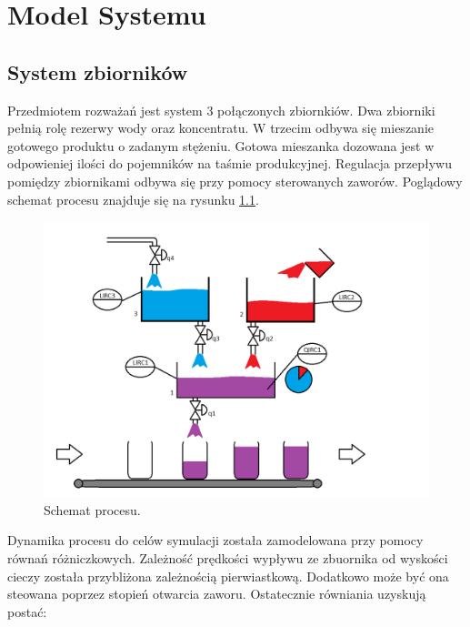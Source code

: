 \chapter{Model Systemu}
\label{model_systemu}
\section{System zbiorników}
\indent Przedmiotem rozważań jest system 3 połączonych zbiornkiów. Dwa zbiorniki pełnią rolę rezerwy wody oraz koncentratu. W trzecim odbywa się mieszanie gotowego produktu o zadanym stężeniu. Gotowa mieszanka dozowana jest w odpowieniej ilości do pojemników na taśmie produkcyjnej. Regulacja przepływu pomiędzy zbiornikami odbywa się przy pomocy sterowanych zaworów. Poglądowy schemat procesu znajduje się na rysunku \ref{fig:Proces}.
\begin{figure}[H]
	\centering
	\includegraphics[scale = 0.5]{fig/Proces_schema_updated.png}
	\caption{Schemat procesu.}
	\label{fig:Proces}
\end{figure}

Dynamika procesu do celów symulacji została zamodelowana przy pomocy równań różniczkowych. Zależność prędkości wypływu ze zbuornika od wyskości cieczy została przybliżona zależnością pierwiastkową. Dodatkowo może być ona steowana poprzez stopień otwarcia zaworu. Ostatecznie równiania uzyskują postać:


